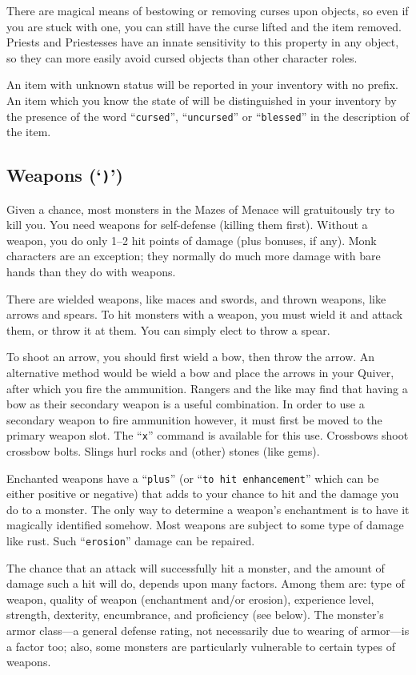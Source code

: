 There are magical means of bestowing or removing curses upon objects,
so even if you are stuck with one, you can still have the curse
lifted and the item removed.  Priests and Priestesses have an innate
sensitivity to this property in any object, so they can more easily avoid
cursed objects than other character roles.

An item with unknown status will be reported in your inventory with no prefix.
An item which you know the state of will be distinguished in your inventory
by the presence of the word ``{\tt cursed}'', ``{\tt uncursed}'' or ``{\tt blessed}'' in the
description of the item.
\subsection*{Weapons (`{\tt )}')}


Given a chance, most monsters in the Mazes of Menace will gratuitously try to
kill you.  You need weapons for self-defense (killing them first).  Without a
weapon, you do only 1--2 hit points of damage (plus bonuses, if any).
Monk characters are an exception; they normally do much more damage with
bare hands than they do with weapons.

There are wielded weapons, like maces and swords, and thrown weapons,
like arrows and spears.  To hit monsters with a weapon, you must wield it and
attack them, or throw it at them.  You can simply elect to throw a spear.

To shoot an arrow, you should first wield a bow, then throw the arrow.
An alternative method would be wield a bow and place the arrows in your
Quiver, after which you fire the ammunition.
Rangers and the like may find that having a bow as their secondary weapon
is a useful combination. In order to use a secondary weapon to fire ammunition
however, it must first be moved to the primary weapon slot. The ``{\tt x}'' command
is available for this use.
Crossbows shoot crossbow bolts.  Slings hurl rocks and (other) stones
(like gems).

Enchanted weapons have a ``{\tt plus}'' (or ``{\tt to hit enhancement}'' which can be
either positive or negative) that adds to your chance to
hit and the damage you do to a monster.  The only way to determine a weapon's
enchantment is to have it magically identified somehow.
Most weapons are subject to some type of damage like rust.  Such
``{\tt erosion}'' damage can be repaired.

The chance that an attack will successfully hit a monster, and the amount
of damage such a hit will do, depends upon many factors.  Among them are:
type of weapon, quality of weapon (enchantment and/or erosion), experience
level, strength, dexterity, encumbrance, and proficiency (see below).  The
monster's armor class---a general defense rating, not necessarily due to
wearing of armor---is a factor too; also, some monsters are particularly
vulnerable to certain types of weapons.

